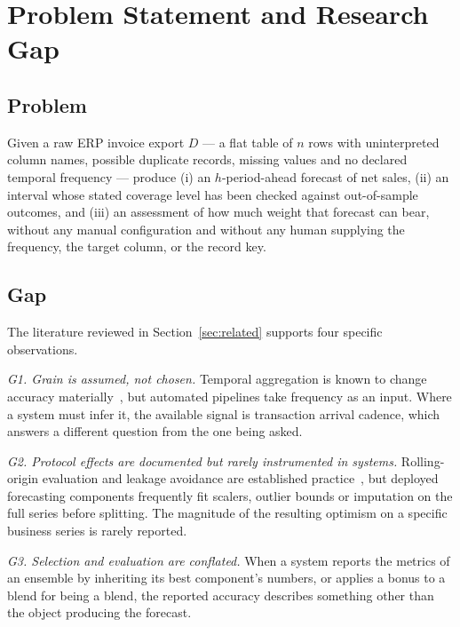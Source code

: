 \documentclass[conference]{IEEEtran}
\begin{document}
\section{Problem Statement and Research Gap}
\label{sec:gap}

\subsection{Problem}

Given a raw ERP invoice export $D$ --- a flat table of $n$ rows with
uninterpreted column names, possible duplicate records, missing values and no
declared temporal frequency --- produce (i) an $h$-period-ahead forecast of net
sales, (ii) an interval whose stated coverage level has been checked against
out-of-sample outcomes, and (iii) an assessment of how much weight that
forecast can bear, without any manual configuration and without any human
supplying the frequency, the target column, or the record key.

\subsection{Gap}

The literature reviewed in Section~\ref{sec:related} supports four specific
observations.

\emph{G1. Grain is assumed, not chosen.} Temporal aggregation is known to
change accuracy materially~\cite{athanasopoulos2017temporal}, but automated
pipelines take frequency as an input. Where a system must infer it, the
available signal is transaction arrival cadence, which answers a different
question from the one being asked.

\emph{G2. Protocol effects are documented but rarely instrumented in
systems.} Rolling-origin evaluation and leakage avoidance are established
practice~\cite{tashman2000outofsample,bergmeir2012cv,kaufman2012leakage}, but
deployed forecasting components frequently fit scalers, outlier bounds or
imputation on the full series before splitting. The magnitude of the resulting
optimism on a specific business series is rarely reported.

\emph{G3. Selection and evaluation are conflated.} When a system reports the
metrics of an ensemble by inheriting its best component's numbers, or applies
a bonus to a blend for being a blend, the reported accuracy describes
something other than the object producing the forecast.
\end{document}
